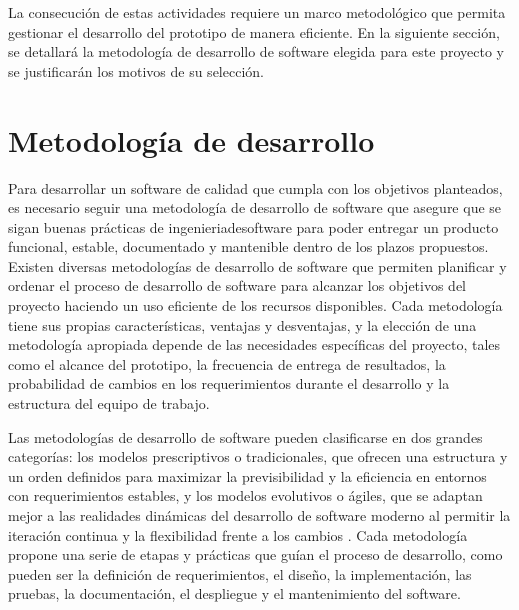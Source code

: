 La consecución de estas actividades requiere un marco metodológico que permita gestionar el desarrollo del prototipo de manera eficiente. En la siguiente sección, se detallará la metodología de desarrollo de software elegida para este proyecto y se justificarán los motivos de su selección.

\section{Metodología de desarrollo}
\label{sec:software-method}

Para desarrollar un \gls{software} de calidad que cumpla con los objetivos planteados, es necesario seguir una metodología de desarrollo de software que asegure que se sigan buenas prácticas de \gls{ingenieriadesoftware} para poder entregar un producto funcional, estable, documentado y mantenible dentro de los plazos propuestos. Existen diversas metodologías de desarrollo de software que permiten planificar y ordenar el proceso de desarrollo de software para alcanzar los objetivos del proyecto haciendo un uso eficiente de los recursos disponibles. Cada metodología tiene sus propias características, ventajas y desventajas, y la elección de una metodología apropiada depende de las necesidades específicas del proyecto, tales como el alcance del prototipo, la frecuencia de entrega de resultados, la probabilidad de cambios en los requerimientos durante el desarrollo y la estructura del equipo de trabajo.

Las metodologías de desarrollo de software pueden clasificarse en dos grandes categorías: los modelos prescriptivos o tradicionales, que ofrecen una estructura y un orden definidos para maximizar la previsibilidad y la eficiencia en entornos con requerimientos estables, y los modelos evolutivos o ágiles, que se adaptan mejor a las realidades dinámicas del desarrollo de software moderno al permitir la iteración continua y la flexibilidad frente a los cambios \cite{pressman2010ingenieria}. Cada metodología propone una serie de etapas y prácticas que guían el proceso de desarrollo, como pueden ser la definición de requerimientos, el diseño, la implementación, las pruebas, la documentación, el despliegue y el mantenimiento del software.

